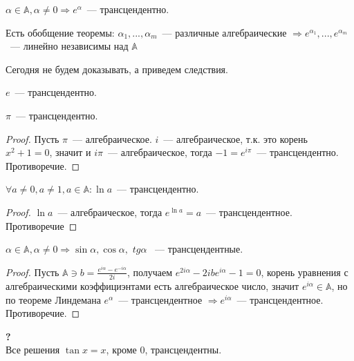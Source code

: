 \begin{theorem}[Линдеман, 1882]
$\alpha \in \mathbb{A}, \alpha \not = 0 \Rightarrow e^{\alpha}$~— трансцендентно.
\end{theorem}
\begin{note} Есть обобщение теоремы:
$\alpha_1,...,\alpha_m $~— различные алгебраические $\Rightarrow e^{\alpha_1}, ..., e^{\alpha_m}$~— линейно независимы над $\mathbb{A}$
\end{note}
Сегодня не будем доказывать, а приведем следствия.
\begin{imp}
$e$~— трансцендентно.
\end{imp}
\begin{imp}
$\pi$~— трансцендентно.
\end{imp}
\begin{proof}
Пусть $\pi$~— алгебраическое. $i$~— алгебраическое, т.к. это корень $x^2 + 1 = 0$, значит и $i\pi$~— алгебраическое, тогда $-1 = e^{i\pi}$~— трансцендентно. Противоречие.
\end{proof}
\begin{imp}
$\forall a\not = 0, a \not = 1, a \in \mathbb{A} : \ln a $~— трансцендентно.
\end{imp}
\begin{proof}
$\ln a$~— алгебраическое, тогда $e^{\ln a} = a$~— трансцендентное. Противоречие
\end{proof}
\begin{imp}
$\alpha \in \mathbb{A}, \alpha \not = 0 \Rightarrow \sin\alpha , \cos\alpha ,$
$ tg\alpha$ 
~— трансцендентные.
\end{imp}
\begin{proof}
Пусть $ \mathbb{A} \ni b = \frac{e^{i\alpha} - e^{-i\alpha}}{2i}$, получаем $e^{2i\alpha} - 2ibe^{i\alpha} - 1 = 0$,
корень уравнения с алгебраическими коэффициэнтами есть алгебраическое число, значит $e^{i\alpha} \in \mathbb{A}$, но по теореме Линдемана $e^{\alpha}$~— трансцендентное $\Rightarrow e^{i\alpha}$~— трансцендентное. Противоречие.
\end{proof}
\begin{imp}\textbf{?}\\
Все решения $\tan x = x$, кроме $0$, трансцендентны.
\end{imp}

